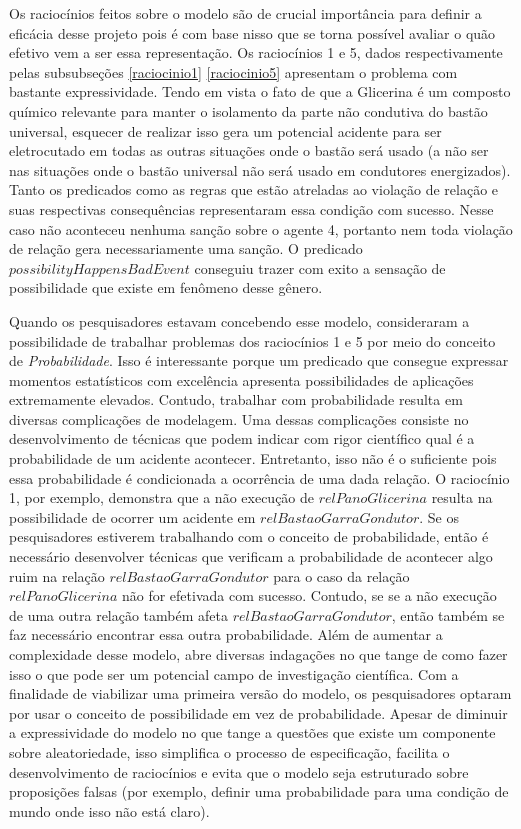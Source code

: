 Os raciocínios feitos sobre o modelo são de crucial importância para definir a eficácia desse projeto pois é com base nisso que se torna possível avaliar o quão 
efetivo vem a ser essa representação. Os raciocínios 1 e 5, dados respectivamente pelas subsubseções \ref{raciocinio1} \ref{raciocinio5} apresentam o problema com bastante expressividade. 
Tendo em vista o fato de que a Glicerina  é um composto químico relevante para manter o isolamento da parte não condutiva do bastão universal, esquecer de realizar isso gera um potencial acidente para ser eletrocutado em todas as outras situações onde o bastão será usado (a não ser nas situações onde o bastão universal não será usado em condutores energizados). Tanto os predicados como as regras que estão
atreladas ao violação de relação e suas respectivas consequências representaram essa condição com sucesso. Nesse caso não aconteceu nenhuma sanção sobre o agente 4, portanto nem toda 
violação de relação gera necessariamente uma sanção. O predicado $possibilityHappensBadEvent$ conseguiu trazer com exito a sensação de possibilidade que existe em fenômeno desse gênero. 

Quando os pesquisadores estavam concebendo esse modelo, consideraram a possibilidade de trabalhar problemas dos raciocínios 1 e 5 por meio do conceito de \textit{Probabilidade}. Isso é interessante 
porque um predicado que consegue expressar momentos estatísticos com excelência apresenta possibilidades de aplicações extremamente elevados. Contudo, trabalhar com probabilidade resulta 
em diversas complicações de modelagem. Uma dessas complicações consiste no desenvolvimento de técnicas que podem indicar com rigor científico qual é a probabilidade de um acidente acontecer. 
Entretanto, isso não é o suficiente pois essa probabilidade é condicionada a ocorrência de uma dada relação. O raciocínio 1, por exemplo, demonstra que a não execução de $relPanoGlicerina$ resulta 
na possibilidade de ocorrer um acidente em $relBastaoGarraGondutor$. Se os pesquisadores estiverem trabalhando com o conceito de probabilidade, então é necessário desenvolver técnicas que 
verificam a probabilidade de acontecer algo ruim na relação $relBastaoGarraGondutor$ para o caso da relação $relPanoGlicerina$ não for efetivada com sucesso. Contudo, se se a não execução de uma 
outra relação também afeta $relBastaoGarraGondutor$, então também se faz necessário encontrar essa outra probabilidade. Além de aumentar a complexidade desse modelo, abre diversas indagações 
no que tange de como fazer isso o que pode ser um potencial campo de investigação científica. Com a finalidade de viabilizar uma primeira versão do modelo, os pesquisadores optaram por 
usar o conceito de possibilidade em vez de probabilidade. Apesar de diminuir a expressividade do modelo no que tange a questões que existe um componente sobre aleatoriedade, isso simplifica 
o processo de especificação, facilita o desenvolvimento de raciocínios e evita que o modelo seja estruturado sobre proposições falsas (por exemplo, definir uma probabilidade para uma condição 
de mundo onde isso não está claro). 

